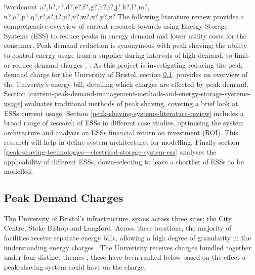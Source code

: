 \documentclass[fontsize=9.5pt]{extarticle}
\newcounter{words}
\newenvironment{counted}{%
  \setcounter{words}{0}
  \SearchList!{wordcount}{\stepcounter{words}}
    {a?,b?,c?,d?,e?,f?,g?,h?,i?,j?,k?,l?,m?,
    n?,o?,p?,q?,r?,s?,t?,u?,v?,w?,x?,y?,z?}
  \UndoBoundary{'}
  \SearchOrder{p;}}{%
  \StopSearching}
\begin{document}
\begin{counted}
The following literature review provides a comprehensive overview of
current research towards using Energy Storage Systems (ESS) to reduce
peaks in energy demand and lower utility costs for the consumer. Peak
demand reduction is synonymous with peak shaving; the ability to control
energy usage from a supplier during intervals of high demand, to limit
or reduce demand charges \cite{schneiderRECPS}, \cite{baldorPS}. As this
project is investigating reducing the peak demand charge for the
University of Bristol, section \ref{peak-demand-charges}, provides an
overview of the Univerity's energy bill, detailing which charges are
effected by peak demand. Section
\ref{current-peak-demand-management-methods-and-energy-storage-systems-usage}
evaluates traditional methods of peak shaving, covering a brief look at
ESSs current usage. Section \ref{peak-shaving-systems-literature-review}
includes a broad range of research of ESSs in different case studies,
optimising the system architecture and analysis on ESSs financial return
on investment (ROI). This research will help in define system
architectures for modelling. Finally section
\ref{peak-shaving-technologies---electrical-storage-system-ess} analyses
the applicability of different ESSs, down-selecting to leave a shortlist
of ESSs to be modelled.

\subsection{Peak Demand Charges}\label{peak-demand-charges}

The University of Bristol's infrastructure, spans across three sites;
the City Centre, Stoke Bishop and Langford. Across these locations, the
majority of facilities receive separate energy bills, allowing a high
degree of granularity in the understanding energy charges
\cite{Jbrentmeet}. The Univerisity receives charges bundled together
under four distinct themes \cite{Jbrentmeet}, these have been ranked
below based on the effect a peak-shaving system could have on the
charge.


\end{counted}
\end{document}
